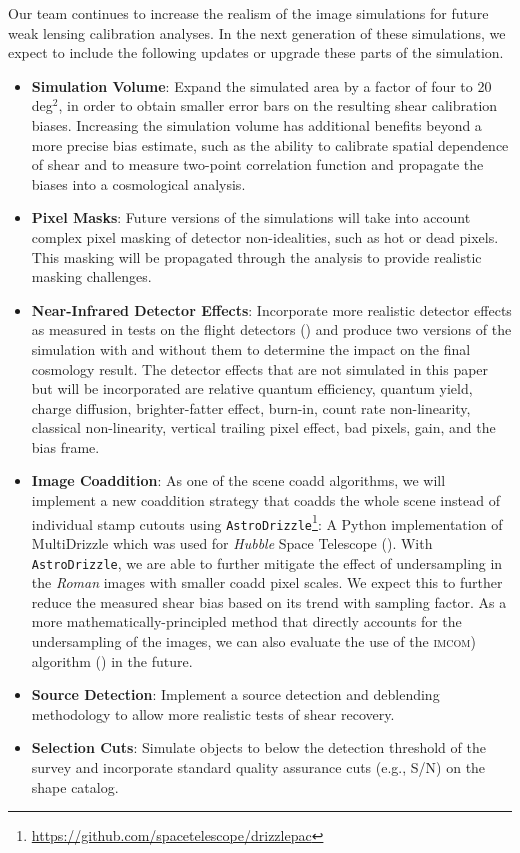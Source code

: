 \documentclass[fleqn,usenatbib]{mnras}
\begin{document}
Our team continues to increase the realism of the image simulations for future weak lensing calibration analyses. In the next generation of these simulations, we expect to include the following updates or upgrade these parts of the simulation. 
\begin{itemize}
    \setlength\itemsep{1em}
    \item \textbf{Simulation Volume}: Expand the simulated area by a factor of four to 20 \textrm{deg}$^{2}$, in order to obtain smaller error bars on the resulting shear calibration biases. Increasing the simulation volume has additional benefits beyond a more precise bias estimate, such as the ability to calibrate spatial dependence of shear and to measure two-point correlation function and propagate the biases into a cosmological analysis.
    
    \item \textbf{Pixel Masks}: Future versions of the simulations will take into account complex pixel masking of detector non-idealities, such as hot or dead pixels. This masking will be propagated through the analysis to provide realistic masking challenges. 
    
    \item \textbf{Near-Infrared Detector Effects}: Incorporate more realistic detector effects as measured in tests on the flight detectors (\citealt{2020JATIS...6d6001M}) and produce two versions of the simulation with and without them to determine the impact on the final cosmology result. The detector effects that are not simulated in this paper but will be incorporated are relative quantum efficiency, quantum yield, charge diffusion, brighter-fatter effect, burn-in, count rate non-linearity, classical non-linearity, vertical trailing pixel effect, bad pixels, gain, and the bias frame.
    
    \item \textbf{Image Coaddition}: As one of the scene coadd algorithms, we will implement a new coaddition strategy that coadds the whole scene instead of individual stamp cutouts using  \texttt{AstroDrizzle}\footnote{\url{https://github.com/spacetelescope/drizzlepac}}: A Python implementation of MultiDrizzle which was used for \emph{Hubble} Space Telescope (\citealt{2003hstc.conf..325B}). With \texttt{AstroDrizzle}, we are able to further mitigate the effect of undersampling in the \emph{Roman} images with smaller coadd pixel scales. We expect this to further reduce the measured shear bias based on its trend with sampling factor. As a more mathematically-principled method that directly accounts for the undersampling of the images, we can also evaluate the use of the \textsc{imcom}) algorithm (\citealt{2011ApJ...741...46R}) in the future.
    
    \item \textbf{Source Detection}: Implement a source detection and deblending methodology to allow more realistic tests of shear recovery.
    
    \item \textbf{Selection Cuts}: Simulate objects to below the detection threshold of the survey and incorporate standard quality assurance cuts (e.g., S/N) on the shape catalog. 
\end{itemize}
\end{document}
